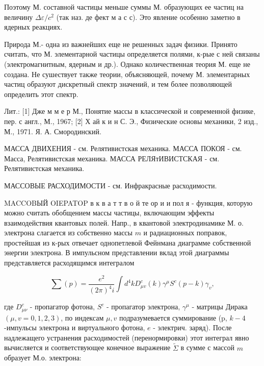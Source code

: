 \documentclass[10pt]{article}
\begin{document}
Поэтому М. составной частицы меньше суммы М. образующих ее частиц на величину $\Delta \varepsilon / c^{2}$ (так наз. де фект м а с с). Это явление особенно заметно в ядерных реакциях.



Природа М.- одна из важнейших еще не решенных задач физики. Принято считать, что М. элементарной частицы определяется полями, к-рые с ней связаны (электромагнитным, ядерным и др.). Однако количественная теория М. еще не создана. Не сушествует также теории, объясняющей, почему М. элементарных частиц образуют дискретный спектр значений, и тем более позволяющей определить этот спектр.



Лит.: [1] Дже м м е р М., Понятие массы в классической и современной физике, пер. с англ., М., 1967; [2] Х ай к и н С. Э., Физические основы механики, 2 изд., М., 1971. Я. А. Смородинский.



МАССА ДВИХЕНИЯ - см. Релятивистская механика. МАССА ПОКОЯ - см. Масса, Релятивистская механика. МАССА РЕЛЯтИВИСТСКАЯ - см. Релятивистская механика.



МАССОВЫЕ РАСХОДИМОСТИ - см. Инфракрасные расходимости.



MACCOBЫЙ OIEPATOP в к в а т т в о й те ор и и пол я - функция, которую можно считать обобщением массы частицы, включающим эффекты взаимодействия квантовых полей. Напр., в квантовой электродинамике М. о. электрона слагается из собственно массы $m$ и радиационных поправок, простейшая из к-рых отвечает однопетлевой Фейнмана диаграмме собственной энергии электрона. В импульсном представлении вклад этой диаграммы представляется расходящимся интегралом



\[

\sum(p)=\frac{e^{2}}{(2 \pi)^{4} i} \int d^{4} k D_{\mu v}^{c}(k) \gamma^{\mu} S^{c}(p-k) \gamma_{v},

\]



где $D_{\mu \nu}^{c}$ - пропагатор фотона, $S^{c}$ - пропагатор электрона, $\gamma^{\mu}$ - матрицы Дирака $(\mu, v=0,1,2,3)$, по индексам $\mu, v$ подразумевается суммирование (p, $k-4$-импульсы электрона и виртуального фотона, $e$ - электрич. заряд). После надлежащего устранения расходимостей (перенормировки) этот интеграл явно вычисляется и соответствующее конечное выражение $\tilde{\Sigma}$ в сумме с массой $m$ образует М.о. электрона:
\end{document}
